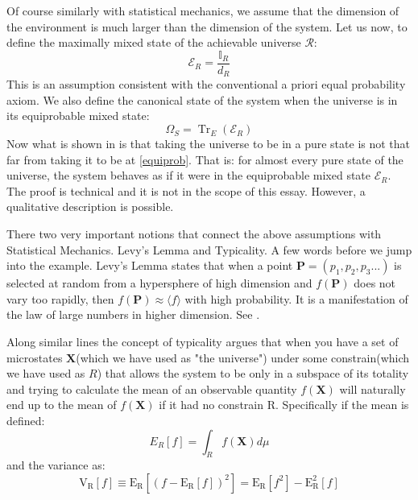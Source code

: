 \documentclass[a4paper,12pt]{article}
\begin{document}
Of course similarly with statistical mechanics, we assume that the dimension of the environment is much larger than the dimension of the system. Let us now, to define the maximally mixed state of the achievable universe $\mathcal{R}$:
\begin{equation}
\mathcal{E}_{R}=\frac{\mathbb{I}_{R}}{d_{R}}
\label{equiprob}
\end{equation}
This is an assumption consistent with the conventional a priori equal probability axiom. We also define the canonical state of the system when the universe is in its equiprobable mixed state:
\begin{equation}\Omega_{S}=\operatorname{Tr}_{E}\left(\mathcal{E}_{R}\right)
\end{equation}
Now what is shown in \cite{popescu2006entanglement} is that taking the universe to be in a pure state is not that far from taking it to be at \eqref{equiprob}. That is: for almost every pure state of
the universe, the system behaves as if it were in the equiprobable mixed state $\mathcal{E}_{R}$. The proof is technical and it is not in the scope of this essay. However, a qualitative description is possible.
\par There two very important notions that connect the above assumptions with Statistical Mechanics. Levy's Lemma and Typicality. A few words before we jump into the example. Levy's Lemma states that when a point $\textbf{P}=(p_1,p_2,p_3...)$ is selected at random from a hypersphere of high dimension
and $f(\textbf{P})$ does not vary too rapidly, then $f(\textbf{P}) \approx\langle f\rangle$ with
high probability. It is a manifestation of the law of large numbers in higher dimension. See \cite{milman2009asymptotic}.
\par
Along similar lines the concept of typicality argues that when you have a set of microstates $\textbf{X}$(which we have used as "the universe") under some constrain(which we have used as $R$) that allows the system to be only in a subspace of its totality and trying to calculate the mean of an observable quantity $f(\textbf{X})$ will naturally end up to the mean of $f(\textbf{X})$ if it had no constrain R. Specifically if the mean is defined:
\begin{equation}
E_R[f]=\int_{R} f(\textbf{X}) d \mu
\end{equation}
and the variance as:
\begin{equation}\mathrm{V}_{\mathrm{R}}[f] \equiv \mathrm{E}_{\mathrm{R}}\left[\left(f-\mathrm{E}_{\mathrm{R}}[f]\right)^{2}\right]=\mathrm{E}_{\mathrm{R}}\left[f^{2}\right]-\mathrm{E}_{\mathrm{R}}^{2}[f]
\end{equation}
\end{document}
